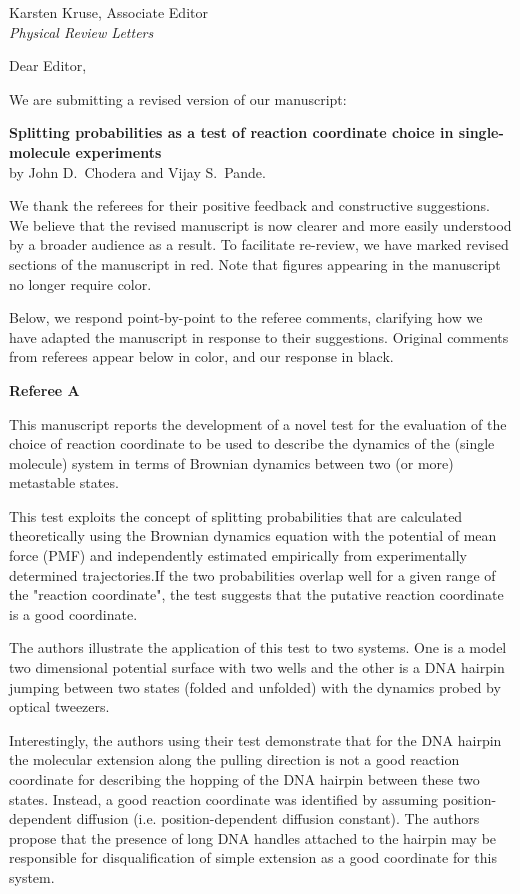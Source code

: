 \documentclass[ucb,qb3,10pt,fullfrom]{ucletter}
\date{\today}
\begin{document}
\begin{letter}{Karsten Kruse, Associate Editor\\
\emph{Physical Review Letters}}

\small

\opening{Dear Editor,}

We are submitting a revised version of our manuscript:

{\bf Splitting probabilities as a test of reaction coordinate choice in single-molecule experiments}\\
by John D.~Chodera and Vijay S.~Pande.

We thank the referees for their positive feedback and constructive suggestions.
We believe that the revised manuscript is now clearer and more easily understood by a broader audience as a result.
To facilitate re-review, we have marked revised sections of the manuscript in red.
Note that figures appearing in the manuscript no longer require color.

Below, we respond point-by-point to the referee comments, clarifying how we have adapted the manuscript in response to their suggestions.
Original comments from referees appear below in color, and our response in black.

\color{blue}
{\bf Referee A}

This manuscript reports the development of a novel test for the
evaluation of the choice of reaction coordinate to be used to describe
the dynamics of the (single molecule) system in terms of Brownian
dynamics between two (or more) metastable states.

This test exploits the concept of splitting probabilities that are
calculated theoretically using the Brownian dynamics equation with the
potential of mean force (PMF) and independently estimated empirically
from experimentally determined trajectories.If the two probabilities
overlap well for a given range of the "reaction coordinate", the test
suggests that the putative reaction coordinate is a good coordinate.

The authors illustrate the application of this test to two systems.
One is a model two dimensional potential surface with two wells and
the other is a DNA hairpin jumping between two states (folded and
unfolded) with the dynamics probed by optical tweezers.

Interestingly, the authors using their test demonstrate that for the
DNA hairpin the molecular extension along the pulling direction is not
a good reaction coordinate for describing the hopping of the DNA
hairpin between these two states. Instead, a good reaction coordinate
was identified by assuming position-dependent diffusion (i.e.
position-dependent diffusion constant). The authors propose that the
presence of long DNA handles attached to the hairpin may be
responsible for disqualification of simple extension as a good
coordinate for this system.


\end{letter}
\end{document}
